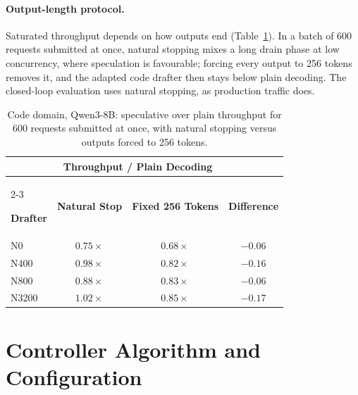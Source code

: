 \documentclass{article}
\begin{document}
\paragraph{Output-length protocol.} Saturated throughput depends on how outputs end (Table~\ref{tab:protocol}). In a batch of 600 requests submitted at once, natural stopping mixes a long drain phase at low concurrency, where speculation is favourable; forcing every output to 256 tokens removes it, and the adapted code drafter then stays below plain decoding. The closed-loop evaluation uses natural stopping, as production traffic does.

\begin{table}[!htbp]
\caption{Code domain, Qwen3-8B: speculative over plain throughput for 600 requests submitted at once, with natural stopping versus outputs forced to 256 tokens.}
\label{tab:protocol}
\centering\small

\begingroup
\renewcommand{\arraystretch}{1.22}
\setlength{\tabcolsep}{6pt}

\begin{tabular}{@{}lccc@{}}
\toprule

&
\multicolumn{2}{c}{

  \textbf{Throughput / Plain Decoding}
}
& \\

\cmidrule(lr){2-3}

\textbf{Drafter}
& \textbf{Natural Stop}
& \textbf{Fixed 256 Tokens}
& \textbf{Difference} \\

\midrule

N0
& $0.75\times$
& $0.68\times$
& $-0.06$ \\

N400
& $0.98\times$
& $0.82\times$
& $-0.16$ \\

N800
& $0.88\times$
& $0.83\times$
& $-0.06$ \\

N3200
& \cellcolor{tabGain}
  $\boldsymbol{1.02\times}$
& $0.85\times$
& \cellcolor{tabDrop}
  $\boldsymbol{-0.17}$ \\

\bottomrule
\end{tabular}
\endgroup

\end{table}

\FloatBarrier
\section{Controller Algorithm and Configuration}\label{app:controller}
\end{document}
